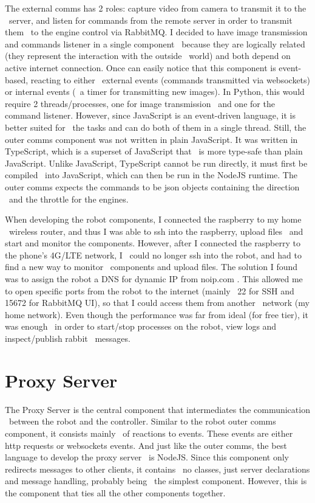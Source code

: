 The external comms has 2 roles: capture video from camera to transmit it to the \
server, and listen for commands from the remote server in order to transmit them \
to the engine control via RabbitMQ.
I decided to have image transmission and commands listener in a single component \
because they are logically related (they represent the interaction with the outside \
world) and both depend on active internet connection.
Once can easily notice that this component is event-based, reacting to either \
external events (commands transmitted via websockets) or internal events (\
a timer for transmitting new images).
In Python, this would require 2 threads/processes, one for image transmission \
and one for the command listener.
However, since JavaScript is an event-driven language, it is better suited for \
the tasks and can do both of them in a single thread.
Still, the outer comms component was not written in plain JavaScript.
It was written in TypeScript, which is a superset of JavaScript that \
is more type-safe than plain JavaScript.
Unlike JavaScript, TypeScript cannot be run directly, it must first be compiled \
into JavaScript, which can then be run in the NodeJS runtime.
The outer comms expects the commands to be json objects containing the direction \
and the throttle for the engines.


When developing the robot components, I connected the raspberry to my home \
wireless router, and thus I was able to ssh into the raspberry, upload files \
and start and monitor the components.
However, after I connected the raspberry to the phone's 4G/LTE network, I \
could no longer ssh into the robot, and had to find a new way to monitor \
components and upload files.
The solution I found was to assign the robot a DNS for dynamic IP from noip.com .
This allowed me to open specific ports from the robot to the internet (mainly \
22 for SSH and 15672 for RabbitMQ UI), so that I could access them from another \
network (my home network).
Even though the performance was far from ideal (for free tier), it was enough \
in order to start/stop processes on the robot, view logs and inspect/publish rabbit \
messages.


\section{Proxy Server}
\label{sec:implementation-proxy-server}
The Proxy Server is the central component that intermediates the communication \
between the robot and the controller.
Similar to the robot outer comms component, it consists mainly \
of reactions to events.
These events are either http requests or websockets events.
And just like the outer comms, the best language to develop the proxy server \
is NodeJS.
Since this component only redirects messages to other clients, it contains \
no classes, just server declarations and message handling, probably being \
the simplest component.
However, this is the component that ties all the other components together.

